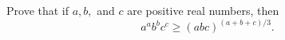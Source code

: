 Prove that if $ a,b,$ and $ c$ are positive real numbers, then \[ a^ab^bc^c \ge (abc)^{(a+b+c)/3}.\]